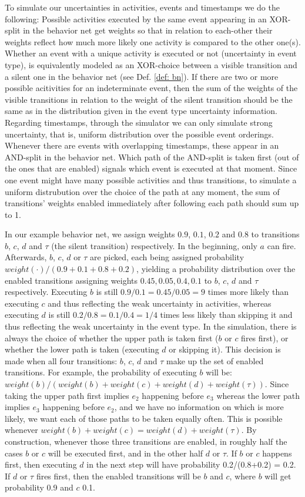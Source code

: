 To simulate our uncertainties in activities, events and timestamps we do the following: 
Possible activities executed by the same event appearing in an XOR-split in the behavior net get weights so that in relation to each-other their weights reflect how much more likely one activity is compared to the other one(s). 
Whether an event with a unique activity is executed or not (uncertainty in event type), is equivalently modeled as an XOR-choice between a visible transition and a silent one in the behavior net (see Def. \ref{def: bn}). 
If there are two or more possible acitivities for an indeterminate event, then the sum of the weights of the visible transitions in relation to the weight of the silent transition should be the same as in the distribution given in the event type uncertainty information.
Regarding timestamps, through the simulator we can only simulate strong uncertainty, that is, uniform distribution over the possible event orderings. Whenever there are events with overlapping timestamps, these appear in an AND-split in the behavior net. 
Which path of the AND-split is taken first (out of the ones that are enabled) signals which event is executed at that moment.
Since one event might have many possible activities and thus transitions, to simulate a uniform distrubution over the choice of the path at any moment, the sum of transitions' weights enabled immediately after following each path should sum up to 1.

In our example behavior net, we assign weights $0.9$, $0.1$, $0.2$ and $0.8$ to transitions $b$, $c$, $d$ and $\tau$ (the silent transition) respectively.
In the beginning, only $a$ can fire.
Afterwards, $b$, $c$, $d$ or $\tau$ are picked, each being assigned probability $weight(\cdot)/ (0.9+0.1+0.8+0.2)$, yielding a probability distribution over the enabled transitions assigning weights $0.45,0.05,0.4,0.1$ to $b$, $c$, $d$ and $\tau$ respectively. 
Executing $b$ is still $0.9/0.1=0.45/0.05=9$ times more likely than executing $c$ and thus reflecting the weak uncertainty in activities, whereas executing $d$ is still $0.2/0.8=0.1/0.4=1/4$ times less likely than skipping it and thus reflecting the weak uncertainty in the event type.
In the simulation, there is always the choice of whether the upper path is taken first ($b$ or $c$ fires first), or whether the lower path is taken (executing $d$ or skipping it). 
This decision is made when all four transitions: $b$, $c$, $d$ and $\tau$ make up the set of enabled transitions. 
For example, the probability of executing $b$ will be:
$weight(b)/(weight(b)+weight(c)+weight(d)+weight(\tau))$. 
Since taking the upper path first implies $e_2$ happening before $e_3$ whereas the lower path implies $e_3$ happening before $e_2$, and we have no information on which is more likely, we want each of those paths to be taken equally often. 
This is possible whenever $weight(b) + weight(c)=weight(d)+weight(\tau)$. 
By construction, whenever those three transitions are enabled, in roughly half the cases $b$ or $c$ will be executed first, and in the other half $d$ or $\tau$.
If $b$ or $c$ happens first, then executing $d$ in the next step will have probability 0.2/(0.8+0.2) = 0.2. 
If $d$ or $\tau$ fires first, then the enabled transitions will be $b$ and $c$, where $b$ will get probability 0.9 and $c$ 0.1.

